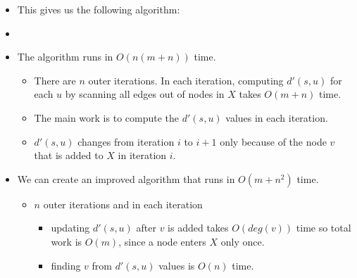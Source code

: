 \documentclass[12pt]{article}
\begin{document}
\begin{itemize}
\begin{itemize}
    \end{itemize}
    \item This gives us the following algorithm:
    \item[] 
    \item The algorithm runs in $O(n(m + n))$ time.
    \begin{itemize}
        \item There are $n$ outer iterations. In each iteration, computing $d'(s, u)$ for each $u$ by scanning all edges out of nodes in $X$ takes $O(m + n)$ time.
        \item The main work is to compute the $d'(s, u)$ values in each iteration.
        \item $d'(s, u)$ changes from iteration $i$ to $i + 1$ only because of the node $v$ that is added to $X$ in iteration $i$.
    \end{itemize}
    \item We can create an improved algorithm that runs in $O(m + n^2)$ time.
    \begin{itemize}
        \item $n$ outer iterations and in each iteration
        \begin{itemize}
            \item updating $d'(s, u)$ after $v$ is added takes $O(deg(v))$ time so total work is $O(m)$, since a node enters $X$ only once.
            \item finding $v$ from $d'(s, u)$ values is $O(n)$ time.
        \end{itemize}
    \end{itemize}
\end{itemize}
\end{document}
